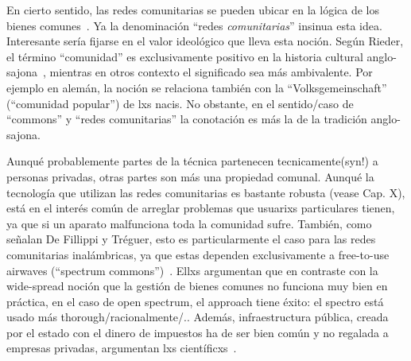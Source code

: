 En cierto sentido, las redes comunitarias se pueden ubicar en la lógica de los bienes comunes~\autocite{FiTre2015}.
Ya la denominación ``redes \textit{comunitarias}'' insinua esta idea.
Interesante sería fijarse en el valor ideológico que lleva esta noción.
Según Rieder, el término ``comunidad'' es exclusivamente positivo en la historia cultural anglo-sajona~\autocite{Rieder2012}, mientras en otros contexto el significado sea más ambivalente.
Por ejemplo en alemán, la noción se relaciona también con la ``Volksgemeinschaft'' (``comunidad popular'') de lxs nacis. %
No obstante, en el sentido/caso de ``commons'' y ``redes comunitarias'' la conotación es más la de la tradición anglo-sajona.

Aunqué probablemente partes de la técnica partenecen tecnicamente(syn!) a personas privadas, otras partes son más una propiedad comunal.
Aunqué la tecnología que utilizan las redes comunitarias es bastante robusta (vease Cap. X), está en el interés común de arreglar problemas que usuarixs particulares tienen, ya que si un aparato malfunciona toda la comunidad sufre.
También, como señalan De Fillippi y Tréguer, esto es particularmente el caso para las redes comunitarias inalámbricas, ya que estas dependen exclusivamente a free-to-use airwaves (``spectrum commons'')~\autocite{FiTre2015}.
Ellxs argumentan que en contraste con la wide-spread noción que la gestión de bienes comunes no funciona muy bien en práctica, en el caso de open spectrum, el approach tiene éxito:
el spectro está usado más thorough/racionalmente/..
Además, infraestructura pública, creada por el estado con el dinero de impuestos ha de ser bien común y no regalada a empresas privadas, argumentan lxs científicxs~\autocite{FiTre2015}.

\begin{comment}

[FiTre2015]
gibts in Altermundis redes local services? (vgl nicos iv)
autonomous local networks + uplink to the internet (which is a potential bottleneck)

[Latour2010]
"the technology.. /digital technology .. makes networks material and explicit" (infrastruktur ist präsent und sichtbar im öffentlichen Raum) --> wem gehört die Infrastruktur? wer kontrolliert die? Wer hat (physischen) Zugang dazu?
  geografía: terreno difícil; quien controla la infraestructura?

"subversion it introduces in the notion of distance (the adjectives “close” and “far” are
made dependant on the presence of conduits, bridges, and hubs)," <-- physical network
\end{comment}


